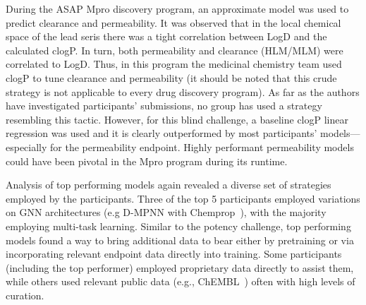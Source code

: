 \documentclass[journal=jcim,manuscript=article]{achemso}
\begin{document}
During the ASAP Mpro discovery program, an approximate model was used to predict clearance and permeability. It was observed that in the local chemical space of the lead seris there was a tight correlation between LogD and the calculated clogP. In turn, both permeability and clearance (HLM/MLM) were correlated to LogD. Thus, in this program the medicinal chemistry team used clogP to tune clearance and permeability (it should be noted that this crude strategy is not applicable to every drug discovery program). As far as the authors have investigated participants' submissions, no group has used a strategy resembling this tactic. However, for this blind challenge, a baseline clogP linear regression was used and it is clearly outperformed by most participants' models---especially for the permeability endpoint.  Highly performant permeability models could have been pivotal in the Mpro program during its runtime. 

Analysis of top performing models again revealed a diverse set of strategies employed by the participants. Three of the top 5 participants employed variations on GNN architectures (e.g D-MPNN with Chemprop~\cite{heid2023chemprop}), with the majority employing multi-task learning. Similar to the potency challenge, top performing models found a way to bring additional data to bear either by pretraining or via incorporating relevant endpoint data directly into training. Some participants (including the top performer) employed proprietary data directly to assist them, while others used relevant public data (e.g., ChEMBL~\cite{zdrazil_2024_chembl}) often with high levels of curation.
\end{document}
